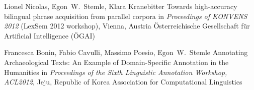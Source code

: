 \documentclass[11pt,a4paper]{moderncv}
\begin{document}



        {Lionel Nicolas, Egon~W.~Stemle, Klara Kranebitter}
        {\small Towards high-accuracy bilingual phrase acquisition from parallel corpora}
        {\small in {\em Proceedings of KONVENS 2012} (LexSem 2012 workshop), Vienna, Austria}
        {\small \"{O}sterreichische Gesellschaft f\"{u}r Artificial Intelligence (\"{O}GAI)}
        {}
    
        {Francesca Bonin, Fabio Cavulli, Massimo Poesio, Egon~W.~Stemle}
        {\small Annotating Archaeological Texts: An Example of
        Domain-Specific Annotation in the Humanities}
        {\small in {\em Proceedings of the Sixth Linguistic Annotation
        Workshop, ACL2012}, Jeju, Republic of Korea}
        {\small Association for Computational Linguistics}
        {}


\end{document}
